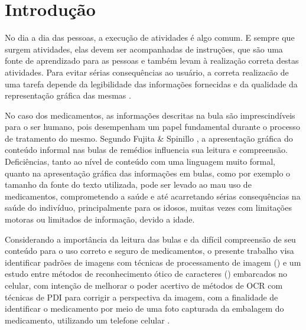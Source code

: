 \chapter{Introdução}\label{ch:intro}

No dia a dia das pessoas, a execução de atividades é algo comum. E sempre que surgem atividades, elas devem ser acompanhadas de instruções, que são uma fonte de aprendizado para as pessoas e também levam à realização correta destas atividades. Para evitar sérias consequências ao usuário, a correta realizacão de uma tarefa depende da legibilidade das informações fornecidas e da qualidade da representação gráfica das mesmas \cite{FUJITA2007}.


No caso dos medicamentos, as informações descritas na bula são imprescindíveis para o ser humano, pois desempenham um papel fundamental durante o processo de tratamento do mesmo. Segundo Fujita & Spinillo \cite{FUJITA2006}, a apresentação gráfica do conteúdo informal nas bulas de remédios influencia sua leitura e compreensão. Deficiências, tanto ao nível de conteúdo com uma linguagem muito formal, quanto na apresentação gráfica das informações em bulas, como por exemplo o tamanho da fonte do texto utilizada, pode ser levado ao mau uso de medicamentos, comprometendo a saúde e até acarretando sérias consequências na saúde do indivíduo, principalmente para os idosos, muitas vezes com limitações motoras ou limitados de informação, devido a idade. 


Considerando a importância da leitura das bulas e da difícil compreensão de seu conteúdo para o uso correto e seguro de medicamentos, o presente trabalho visa identificar padrões de imagens com técnicas de processamento de imagem ()  e um estudo entre métodos de reconhecimento ótico de caracteres () embarcados no celular, com intenção de melhorar o poder acertivo de métodos de OCR com técnicas de PDI para corrigir a perspectiva da imagem, com a finalidade de identificar o medicamento por meio de uma foto capturada da embalagem do medicamento, utilizando um telefone celular .




